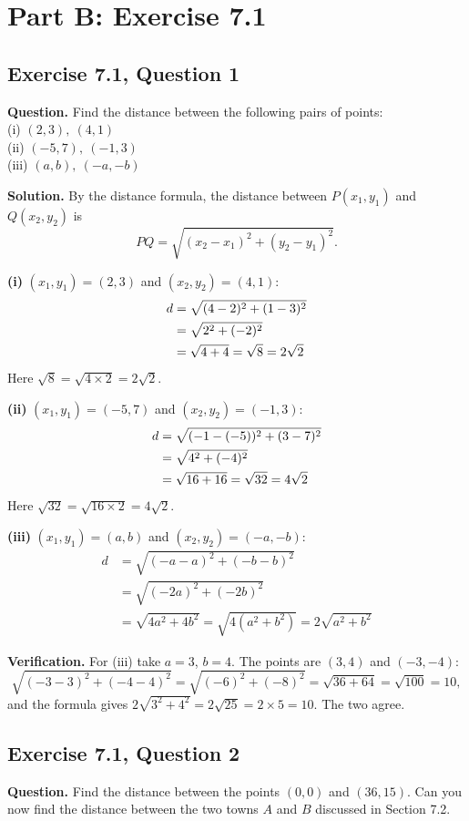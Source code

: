 \newpage
\section*{Part B: Exercise 7.1}

\subsection*{Exercise 7.1, Question 1}
\textbf{Question.} Find the distance between the following pairs of points:\\
(i) $(2,3),\ (4,1)$\\
(ii) $(-5,7),\ (-1,3)$\\
(iii) $(a,b),\ (-a,-b)$

\textbf{Solution.} By the distance formula, the distance between $P(x_1,y_1)$ and $Q(x_2,y_2)$ is
\[PQ=\sqrt{(x_2-x_1)^2+(y_2-y_1)^2}.\]
\distnote

\textbf{(i)} $(x_1,y_1)=(2,3)$ and $(x_2,y_2)=(4,1)$:
\begin{align*}
\dist{d}{2}{3}{4}{1}{2\sqrt2}
\end{align*}
Here $\sqrt8=\sqrt{4\times2}=2\sqrt2$.

\textbf{(ii)} $(x_1,y_1)=(-5,7)$ and $(x_2,y_2)=(-1,3)$:
\begin{align*}
\dist{d}{-5}{7}{-1}{3}{4\sqrt2}
\end{align*}
Here $\sqrt{32}=\sqrt{16\times2}=4\sqrt2$.

\textbf{(iii)} $(x_1,y_1)=(a,b)$ and $(x_2,y_2)=(-a,-b)$:
\begin{align*}
d&=\sqrt{(-a-a)^2+(-b-b)^2}\\
&=\sqrt{(-2a)^2+(-2b)^2}\\
&=\sqrt{4a^2+4b^2}=\sqrt{4(a^2+b^2)}=2\sqrt{a^2+b^2}
\end{align*}

\textbf{Verification.} For (iii) take $a=3$, $b=4$. The points are $(3,4)$ and $(-3,-4)$:
\[
\sqrt{(-3-3)^2+(-4-4)^2}=\sqrt{(-6)^2+(-8)^2}=\sqrt{36+64}=\sqrt{100}=10,
\]
and the formula gives $2\sqrt{3^2+4^2}=2\sqrt{25}=2\times5=10$. The two agree.


\subsection*{Exercise 7.1, Question 2}
\textbf{Question.} Find the distance between the points $(0,0)$ and $(36,15)$. Can you now find the distance between the two towns $A$ and $B$ discussed in Section 7.2.

